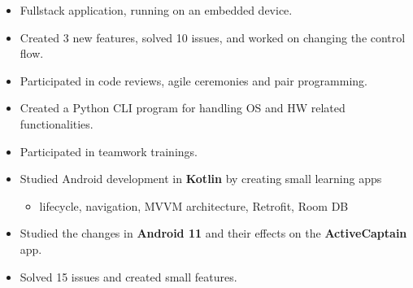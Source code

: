


\begin{itemize}
\item Fullstack application, running on an embedded device.

\item Created 3 new features, solved 10 issues, and worked on changing the control flow.

\item Participated in code reviews, agile ceremonies and pair programming.

\item Created a Python CLI program for handling OS and HW related functionalities.

\item Participated in teamwork trainings.
\end{itemize}

 
 
\divider



\begin{itemize}

\item Studied Android development in \textbf{Kotlin} by creating small learning apps

\begin{itemize}
 \item lifecycle, navigation, MVVM architecture, Retrofit, Room DB
\end{itemize}

\item Studied the changes in \textbf{Android 11} and their effects on the \textbf{ActiveCaptain} app. 



\item Solved 15 issues and created small features.


\end{itemize}

 
